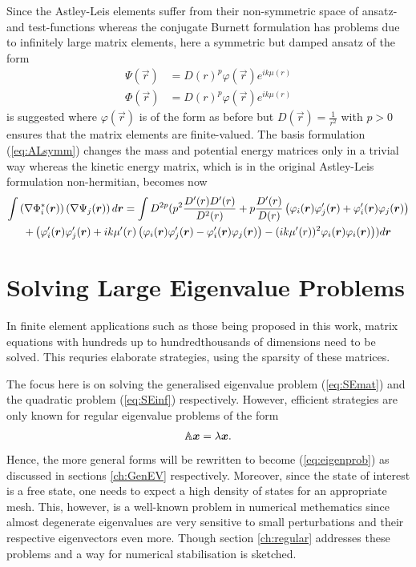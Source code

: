 Since the Astley-Leis elements suffer from their non-symmetric space of ansatz- and test-functions whereas the conjugate Burnett formulation has problems due to infinitely large matrix elements, here a symmetric but damped ansatz of the form
\begin{align} \label{eq:ALsymm}
\Psi(\vec{r}) &= D(r)^p\varphi(\vec{r}) e^{ik\mu(r)} \\
\Phi(\vec{r}) &= D(r)^p\varphi(\vec{r}) e^{ik\mu(r)}
\end{align}
is suggested where $\varphi(\vec{r})$ is of the form as before but $D(\vec{r})=\frac{1}{r^2}$ with $p>0$ ensures that the matrix elements are finite-valued.
The basis formulation (\ref{eq:ALsymm}) changes the mass and potential energy matrices only in a trivial way whereas the kinetic energy matrix, which is in the original Astley-Leis formulation non-hermitian, becomes now
\begin{multline} \label{eq:SymmKinE}
\int \left(\nabla \Phi^*_i(\vec{r})\right) \left(\nabla \Psi_j(\vec{r})\right) d\vec{r}=
\int D^{2p}\large(
p^2 \frac{D'(r) D'(r)}{D^2(r)} +p \frac{D'(r)}{D(r)} \left(\varphi_i(\vec{r})\varphi'_j(\vec{r})+ \varphi'_i(\vec{r})\varphi_j(\vec{r}) \right)\\
+ \left(  \varphi'_i(\vec{r})\varphi'_j(\vec{r}) + ik\mu'(r) \left(\varphi_i(\vec{r})\varphi'_j(\vec{r})- \varphi'_i(\vec{r})\varphi_j(\vec{r})  \right) -(ik\mu'(r))^2 \varphi_i(\vec{r})\varphi_i(\vec{r}) \right)
\large)d\vec{r}  
\end{multline}

\section{Solving Large Eigenvalue Problems}
In finite element applications such as those being proposed in this work, matrix equations with hundreds up to hundredthousands of dimensions need to be solved.
This requries elaborate strategies, using the sparsity of these matrices.

The focus here is on solving the generalised eigenvalue problem (\ref{eq:SEmat}) and the quadratic problem (\ref{eq:SEinf}) respectively.
However, efficient strategies are only known for regular eigenvalue problems of the form 
\begin{equation} \label{eq:eigenprob}
\mat{A}\vec{x}=\lambda\vec{x}.
\end{equation}
Hence, the more general forms will be rewritten to become (\ref{eq:eigenprob}) as discussed in sections \ref{ch:GenEV} respectively.
Moreover, since the state of interest is a free state, one needs to expect a high density of states for an appropriate mesh. 
This, however, is a well-known problem in numerical methematics since almost degenerate eigenvalues are very sensitive to small perturbations and their respective eigenvectors even more.
Though section \ref{ch:regular} addresses these problems and a way for numerical stabilisation is sketched.

